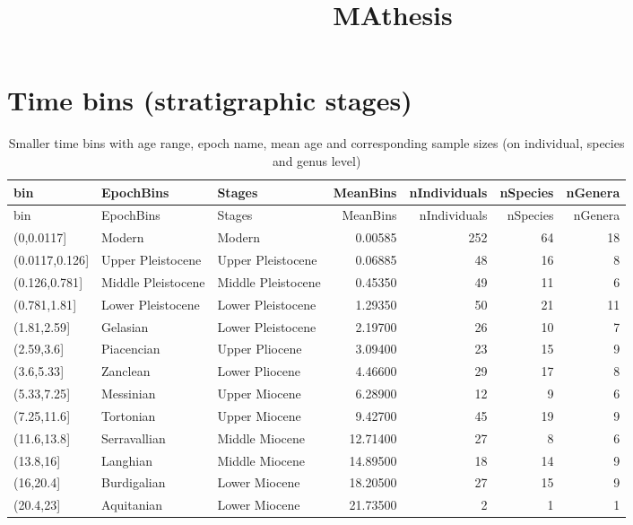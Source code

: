 \documentclass[]{article}
\title{MAthesis}
\author{}
\date{}
\begin{document}
\maketitle

{
\setcounter{tocdepth}{2}
\tableofcontents
}
\section{Time bins (stratigraphic
stages)}\label{time-bins-stratigraphic-stages}

\begin{longtable}[]{@{}lllrrrr@{}}
\caption{Smaller time bins with age range, epoch name, mean age and
corresponding sample sizes (on individual, species and genus
level)}\tabularnewline
\toprule
bin & EpochBins & Stages & MeanBins & nIndividuals & nSpecies &
nGenera\tabularnewline
\midrule
\endfirsthead
\toprule
bin & EpochBins & Stages & MeanBins & nIndividuals & nSpecies &
nGenera\tabularnewline
\midrule
\endhead
(0,0.0117{]} & Modern & Modern & 0.00585 & 252 & 64 & 18\tabularnewline
(0.0117,0.126{]} & Upper Pleistocene & Upper Pleistocene & 0.06885 & 48
& 16 & 8\tabularnewline
(0.126,0.781{]} & Middle Pleistocene & Middle Pleistocene & 0.45350 & 49
& 11 & 6\tabularnewline
(0.781,1.81{]} & Lower Pleistocene & Lower Pleistocene & 1.29350 & 50 &
21 & 11\tabularnewline
(1.81,2.59{]} & Gelasian & Lower Pleistocene & 2.19700 & 26 & 10 &
7\tabularnewline
(2.59,3.6{]} & Piacencian & Upper Pliocene & 3.09400 & 23 & 15 &
9\tabularnewline
(3.6,5.33{]} & Zanclean & Lower Pliocene & 4.46600 & 29 & 17 &
8\tabularnewline
(5.33,7.25{]} & Messinian & Upper Miocene & 6.28900 & 12 & 9 &
6\tabularnewline
(7.25,11.6{]} & Tortonian & Upper Miocene & 9.42700 & 45 & 19 &
9\tabularnewline
(11.6,13.8{]} & Serravallian & Middle Miocene & 12.71400 & 27 & 8 &
6\tabularnewline
(13.8,16{]} & Langhian & Middle Miocene & 14.89500 & 18 & 14 &
9\tabularnewline
(16,20.4{]} & Burdigalian & Lower Miocene & 18.20500 & 27 & 15 &
9\tabularnewline
(20.4,23{]} & Aquitanian & Lower Miocene & 21.73500 & 2 & 1 &
1\tabularnewline
\bottomrule
\end{longtable}
\end{document}
